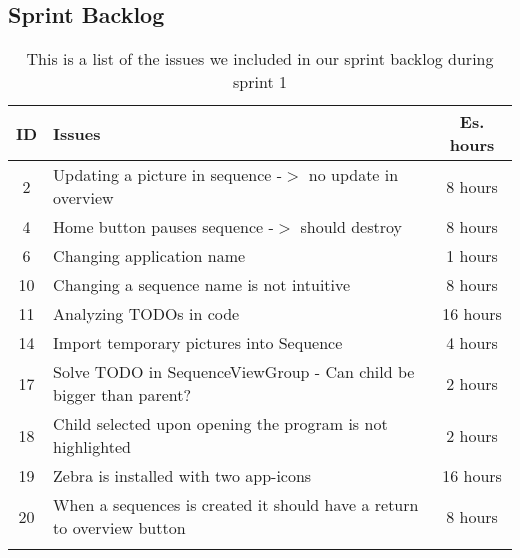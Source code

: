 \subsection{Sprint Backlog}\label{subsec:spr1_sprblog}
\begin{longtable} { | c | p{12cm} | c | } 
\hline
	ID 	&	Issues	&		 Es. hours \\\hline
	2	& 	Updating a picture in sequence -$>$ no update in overview	&	8 hours	\\\hline
	4	& 	Home button pauses sequence -$>$ should destroy	&	8 hours	\\\hline
	6	& 	Changing application name	&	1 hours	\\\hline
	10	& 	Changing a sequence name is not intuitive	&	8 hours	\\\hline
	11	& 	Analyzing TODOs in code	&	16 hours	\\\hline
	14	& 	Import temporary pictures into Sequence	&	4 hours	\\\hline
	17	& 	Solve TODO in SequenceViewGroup - Can child be bigger than parent?	&	2 hours	\\\hline
	18	& 	Child selected upon opening the program is not highlighted	&	2 hours	\\\hline
	19	& 	Zebra is installed with two app-icons	&	16 hours	\\\hline
	20	& 	When a sequences is created it should have a return to overview button	&	8 hours	\\\hline
\caption{This is a list of the issues we included in our sprint backlog during sprint 1}
\label{tab:spr1_prodblog}
\end{longtable}